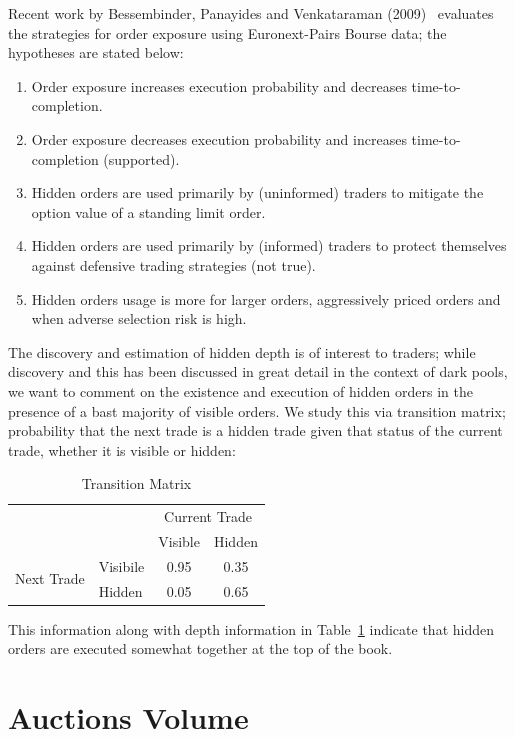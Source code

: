 Recent work by Bessembinder, Panayides and Venkataraman (2009)~\cite{bessenbinder} evaluates the strategies for order exposure using Euronext-Pairs Bourse data; the hypotheses are stated below:
\begin{enumerate}[--]
\item Order exposure increases execution probability and decreases time-to-completion.
\item Order exposure decreases execution probability and increases time-to-completion (supported).
\item Hidden orders are used primarily by (uninformed) traders to mitigate the option value of a standing limit order.
\item Hidden orders are used primarily by (informed) traders to protect themselves against defensive trading strategies (not true).
\item Hidden orders usage is more for larger orders, aggressively priced orders and when adverse selection risk is high.
\end{enumerate}
The discovery and estimation of hidden depth is of interest to traders; while discovery and this has been discussed in great detail in the context of dark pools, we want to comment on the existence and execution of hidden orders in the presence of a bast majority of visible orders. We study this via transition matrix; probability that the next trade is a hidden trade given that status of the current trade, whether it is visible or hidden:
	\begin{table}[!ht]
	\centering
	\caption{Transition Matrix \label{tab:transmatrix}}
	\begin{tabular}{c l | cc}
	& & \multicolumn{2}{c}{Current Trade} \\
	& & Visible & Hidden \\ \hline
	\multirow{2}{*}{Next Trade} & Visibile & 0.95 & 0.35 \\
	& Hidden & 0.05 & 0.65
	\end{tabular}
	\end{table}
This information along with depth information in Table~\ref{tab:transmatrix} indicate that hidden orders are executed somewhat together at the top of the book. 








\section{Auctions Volume}

